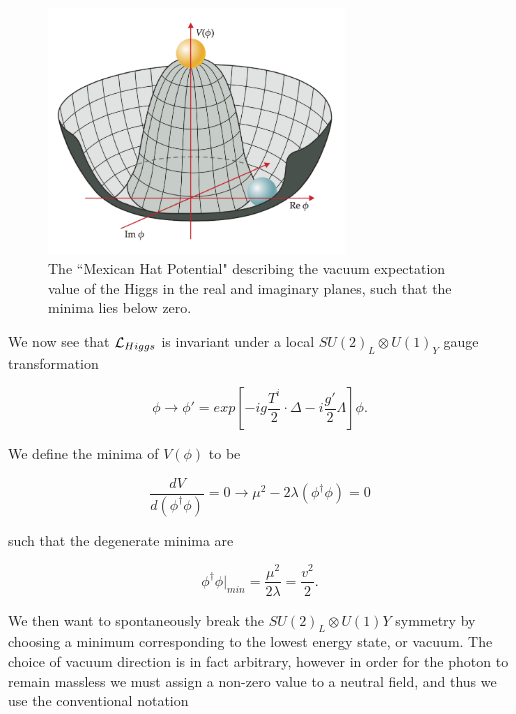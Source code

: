 \begin{figure} \label{fig-MHP}
\begin{center}
\includegraphics[width=0.7\textwidth]{Figures/MexicanHatPotential.png}
\caption{The ``Mexican Hat Potential" describing the vacuum expectation value of the Higgs in the real and imaginary planes, such that the minima lies below zero.}
\end{center}
\end{figure}

We now see that $\mathcal{L}_{Higgs}$ is invariant under a local $SU(2)_L \otimes U(1)_Y$ gauge transformation 

\begin{equation}
\phi \to \phi' = exp[-ig\frac{T^i}{2}\cdot \Delta - i\frac{g'}{2}\Lambda]\phi.
\end{equation}

We define the minima of $V(\phi)$ to be 

\begin{equation}
\frac{dV}{d(\phi^\dagger\phi)} = 0 \rightarrow \mu^2 - 2\lambda(\phi^{\dagger}\phi) = 0
\end{equation}

such that the degenerate minima are

\begin{equation}
\phi^{\dagger}\phi|_{min} = \frac{\mu^2}{2\lambda} = \frac{v^2}{2}.
\end{equation}

We then want to spontaneously break the $SU(2)_L \otimes U(1)Y$ symmetry by choosing a minimum corresponding to the lowest energy state, or vacuum. The choice of vacuum direction is in fact arbitrary, however in order for the photon to remain massless we must assign a non-zero value to a neutral field, and thus we use the conventional notation

